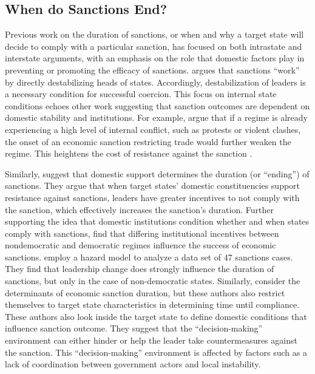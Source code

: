 \subsection*{When do Sanctions End?}
\label{lit}

Previous work on the duration of sanctions, or when and why a target state will decide to comply with a particular sanction, has focused on both intrastate and interstate arguments, with an emphasis on the role that domestic factors play in preventing or promoting the efficacy of sanctions. \cite{marinov2005} argues that sanctions ``work'' by directly destabilizing heads of states. Accordingly, destabilization of leaders is a necessary condition for successful coercion.  This focus on internal state conditions echoes other work suggesting that sanction outcomes are dependent on domestic stability and institutions. For example, {\cite{dashti1997}} argue that if a regime is already experiencing a high level of internal conflict, such as protests or violent clashes, the onset of an economic sanction restricting trade would further weaken the regime. This heightens the cost of resistance against the sanction \citep{dashti1997}. 

Similarly, \cite{dorussen2001} suggest that domestic support determines the duration (or ``ending'') of sanctions. They argue that when target states' domestic constituencies support resistance against sanctions, leaders have greater incentives to not comply with the sanction, which effectively increases the sanction's duration. Further supporting the idea that domestic institutions condition whether and when states comply with sanctions, \cite{lektzian2007} find that differing institutional incentives between nondemocratic and democratic regimes influence the success of economic sanctions. \cite{mcgillivray2004} employ a hazard model to analyze a data set of 47 sanctions cases. They find that leadership change does strongly influence the duration of sanctions, but only in the case of non-democratic states. Similarly, \cite{bolks2000} consider the determinants of economic sanction duration, but these authors also restrict themselves to target state characteristics in determining time until compliance. These authors also look inside the target state to define domestic conditions that influence sanction outcome. They suggest that the ``decision-making'' environment can either hinder or help the leader take countermeasures against the sanction. This ``decision-making'' environment is affected by factors such as a lack of coordination between government actors and local instability. 

